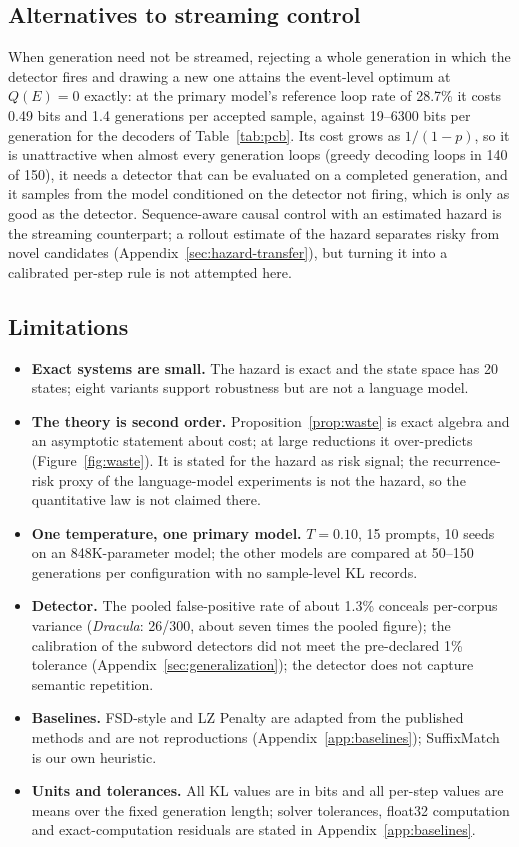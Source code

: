 \documentclass[make,article,submit,pdftex]{Definitions/mdpi}
\begin{document}
\subsection{Alternatives to streaming control}\label{ssec:alternatives}
When generation need not be streamed, rejecting a whole generation in which the detector fires and drawing a new one attains the event-level optimum at $Q(E)=0$ exactly: at the primary model's reference loop rate of 28.7\% it costs 0.49 bits and 1.4 generations per accepted sample, against 19--6300 bits per generation for the decoders of Table~\ref{tab:pcb}. Its cost grows as $1/(1-p)$, so it is unattractive when almost every generation loops (greedy decoding loops in 140 of 150), it needs a detector that can be evaluated on a completed generation, and it samples from the model conditioned on the detector not firing, which is only as good as the detector. Sequence-aware causal control with an estimated hazard is the streaming counterpart; a rollout estimate of the hazard separates risky from novel candidates (Appendix~\ref{sec:hazard-transfer}), but turning it into a calibrated per-step rule is not attempted here.

\subsection{Limitations}
\begin{itemize}[leftmargin=*,itemsep=2pt]
\item \textbf{Exact systems are small.} The hazard is exact and the state space has 20 states; eight variants support robustness but are not a language model.
\item \textbf{The theory is second order.} Proposition~\ref{prop:waste} is exact algebra and an asymptotic statement about cost; at large reductions it over-predicts (Figure~\ref{fig:waste}). It is stated for the hazard as risk signal; the recurrence-risk proxy of the language-model experiments is not the hazard, so the quantitative law is not claimed there.
\item \textbf{One temperature, one primary model.} $T=0.10$, 15 prompts, 10 seeds on an 848K-parameter model; the other models are compared at 50--150 generations per configuration with no sample-level KL records.
\item \textbf{Detector.} The pooled false-positive rate of about 1.3\% conceals per-corpus variance (\emph{Dracula}: 26/300, about seven times the pooled figure); the calibration of the subword detectors did not meet the pre-declared 1\% tolerance (Appendix~\ref{sec:generalization}); the detector does not capture semantic repetition.
\item \textbf{Baselines.} FSD-style and LZ Penalty are adapted from the published methods and are not reproductions (Appendix~\ref{app:baselines}); SuffixMatch is our own heuristic.
\item \textbf{Units and tolerances.} All KL values are in bits and all per-step values are means over the fixed generation length; solver tolerances, float32 computation and exact-computation residuals are stated in Appendix~\ref{app:baselines}.
\end{itemize}
\end{document}

